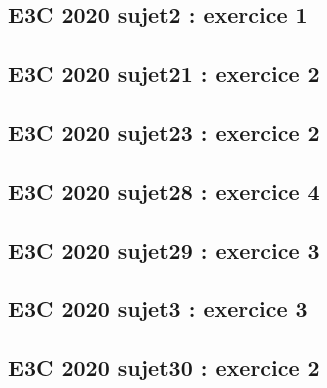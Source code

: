 \documentclass[lang=fr,edition=teacher,layout=sheet]{mxbook}
\begin{document}
\begingroup\endgroup
\par\bigskip
{}\subsection*{E3C 2020 sujet2 : exercice 1}
\begingroup\endgroup
\par\bigskip
{}\subsection*{E3C 2020 sujet21 : exercice 2}
\begingroup\endgroup
\par\bigskip
{}\subsection*{E3C 2020 sujet23 : exercice 2}
\begingroup\endgroup
\par\bigskip
{}\subsection*{E3C 2020 sujet28 : exercice 4}
\begingroup\endgroup
\par\bigskip
{}\subsection*{E3C 2020 sujet29 : exercice 3}
\begingroup\endgroup
\par\bigskip
{}\subsection*{E3C 2020 sujet3 : exercice 3}
\begingroup\endgroup
\par\bigskip
{}\subsection*{E3C 2020 sujet30 : exercice 2}
\end{document}
